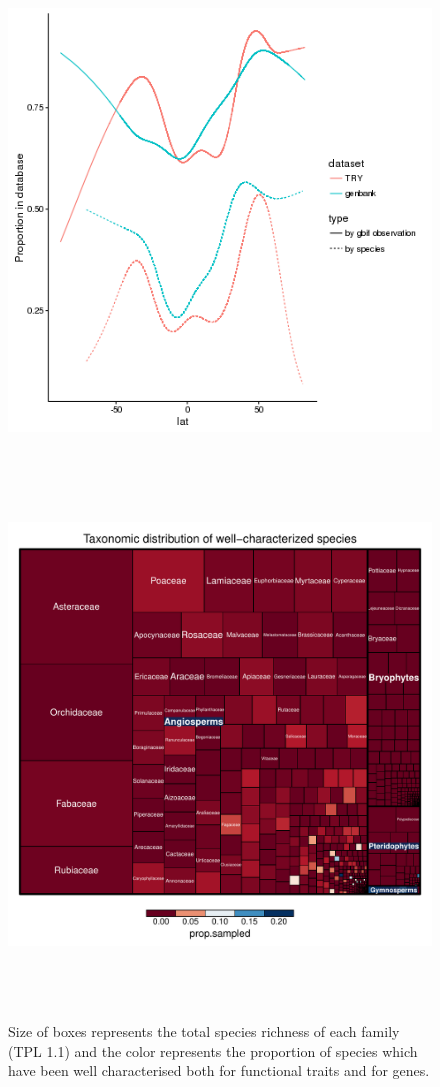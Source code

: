 \documentclass[a4paper,11pt]{article}
\begin{document}
\begin{figure}[h!]
\centering
  \includegraphics[width=\textwidth]{figures/multi_gam.png}
\end{figure}

\begin{figure}[h!]
\centering
  \includegraphics[width=15cm,height=15cm,keepaspectratio]{figures/treemap_well_known.pdf}
  \caption{Size of boxes represents the total species richness of each family (TPL 1.1) and the color represents the proportion of species which have been 
  well characterised both for functional traits and for genes.}
\end{figure}
\end{document}

